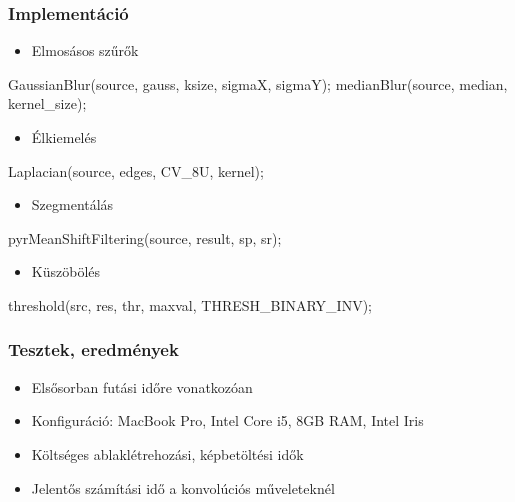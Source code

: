 \documentclass{beamer}
\begin{document}
\begin{frame}[fragile]
\frametitle{Implementáció}

\begin{itemize}
\item Elmosásos szűrők
\end{itemize}

\begin{cpp}
GaussianBlur(source, gauss, ksize, sigmaX, sigmaY);
medianBlur(source, median, kernel_size);
\end{cpp}

\begin{itemize}
\item Élkiemelés
\end{itemize}

\begin{cpp}
Laplacian(source, edges, CV_8U, kernel);
\end{cpp}

\begin{itemize}
\item Szegmentálás
\end{itemize}
\begin{cpp}
pyrMeanShiftFiltering(source, result, sp, sr);
\end{cpp}

\begin{itemize}
\item Küszöbölés
\end{itemize}

\begin{cpp}
threshold(src, res, thr, maxval, THRESH_BINARY_INV);
\end{cpp}


\end{frame}

\begin{frame}[fragile]
\frametitle{Tesztek, eredmények}

\begin{itemize}
\item Elsősorban futási időre vonatkozóan
\item Konfiguráció: MacBook Pro, Intel Core i5, 8GB RAM, Intel Iris
\item Költséges ablaklétrehozási, képbetöltési idők
\item Jelentős számítási idő a konvolúciós műveleteknél
\end{itemize}

\end{frame}
\end{document}
